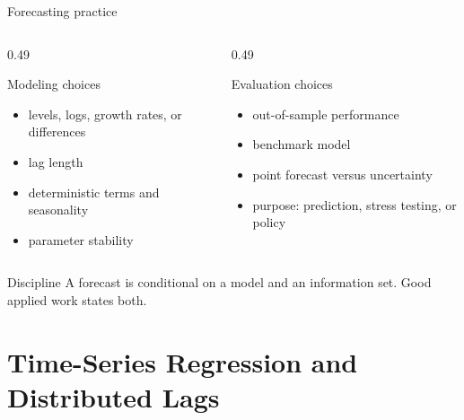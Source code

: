\documentclass[10pt]{beamer}
\begin{document}
\begin{frame}{Forecasting practice}
\small
\begin{columns}[T]
\begin{column}{0.49\textwidth}
\begin{block}{Modeling choices}
\begin{itemize}
  \item levels, logs, growth rates, or differences
  \item lag length
  \item deterministic terms and seasonality
  \item parameter stability
\end{itemize}
\end{block}
\end{column}
\begin{column}{0.49\textwidth}
\begin{block}{Evaluation choices}
\begin{itemize}
  \item out-of-sample performance
  \item benchmark model
  \item point forecast versus uncertainty
  \item purpose: prediction, stress testing, or policy
\end{itemize}
\end{block}
\end{column}
\end{columns}

\pause
\begin{alertblock}{Discipline}
A forecast is conditional on a model and an information set. Good applied work states both.
\end{alertblock}
\end{frame}

\section{Time-Series Regression and Distributed Lags}
\end{document}

